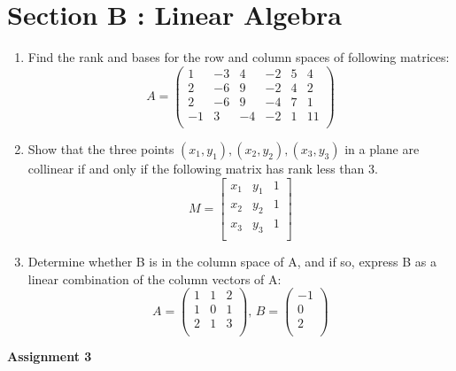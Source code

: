\documentclass[12pt , a4paper]{article}
\begin{document}
\section*{Section B : Linear Algebra}
\begin{enumerate}
\item Find the rank and bases for the row and column spaces of following matrices:
\[
A =
\begin{pmatrix}
1 & -3 & 4 & -2 & 5 & 4 \\
2 & -6 & 9 & -2 & 4 & 2 \\
2 & -6 & 9 & -4 & 7 & 1 \\
-1 & 3 & -4 & -2 & 1 & 11 \\

\end{pmatrix}
\]
\item Show that the three points $(x_1, y_1),(x_2, y_2),(x_3, y_3)$ in a plane are collinear if and only if the following matrix has rank less than 3.
\[
M =
\begin{bmatrix}
x_1 & y_1 & 1 \\
x_2 & y_2 & 1 \\
x_3 & y_3 & 1 \\

\end{bmatrix}
\]
\item Determine whether B is in the column space of A, and if so, express B as a linear combination of the column vectors of A: 
\begin{equation*}
A =
\begin{pmatrix}
1 & 1 & 2 \\
1 & 0 & 1 \\
2 & 1 & 3 \\
\end{pmatrix}
,\,
B =
\begin{pmatrix}
-1 \\
0 \\
2 \\
\end{pmatrix}
\end{equation*}

\end{enumerate}

\newpage

\begin{Huge}
\begin{center}
\bf Assignment 3
\end{center}
\end{Huge}
\pagebreak
\end{document}
